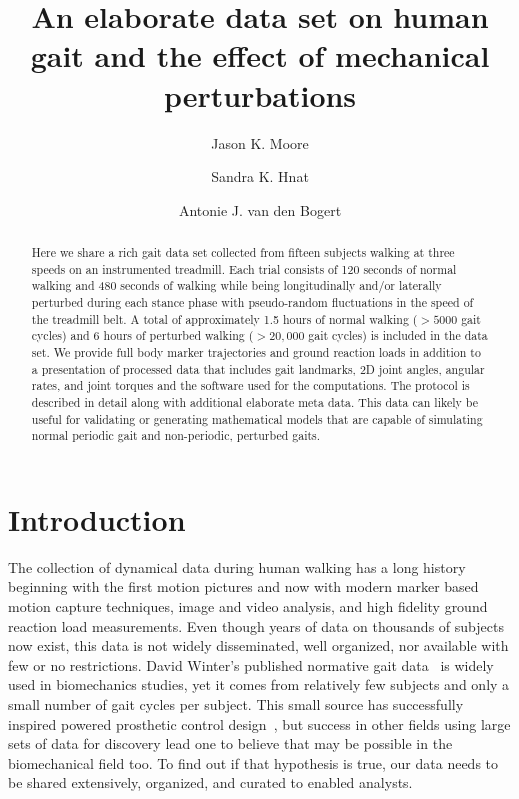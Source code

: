 \documentclass[10pt,a4paper,twocolumn]{article}
\begin{document}
\title{An elaborate data set on human gait and the effect of mechanical
  perturbations}

\author[1]{Jason K. Moore}
\author[1]{Sandra K. Hnat}
\author[1]{Antonie J. van den Bogert}


\maketitle
\thispagestyle{fancy}

\begin{abstract}

  Here we share a rich gait data set collected from fifteen subjects walking at
  three speeds on an instrumented treadmill. Each trial consists of 120 seconds
  of normal walking and 480 seconds of walking while being longitudinally
  and/or laterally perturbed during each stance phase with pseudo-random
  fluctuations in the speed of the treadmill belt. A total of approximately 1.5
  hours of normal walking ($>5000$ gait cycles) and 6 hours of perturbed walking
  ($>20,000$ gait cycles) is included in the data set. We provide full body
  marker trajectories and ground reaction loads in addition to a presentation of
  processed data that includes gait landmarks, 2D joint angles, angular rates,
  and joint torques and the software used for the computations. The protocol is
  described in detail along with additional elaborate meta data. This data can
  likely be useful for validating or generating mathematical models that are
  capable of simulating normal periodic gait and non-periodic, perturbed gaits.

\end{abstract}
\clearpage

\section*{Introduction}
%
The collection of dynamical data during human walking has a long history
beginning with the first motion pictures and now with modern marker based
motion capture techniques, image and video analysis, and high fidelity ground
reaction load measurements. Even though years of data on thousands of subjects
now exist, this data is not widely disseminated, well organized, nor available
with few or no restrictions. David Winter's published normative gait
data~\cite{Winter1990} is widely used in biomechanics studies, yet it comes
from relatively few subjects and only a small number of gait cycles per
subject. This small source has successfully inspired powered prosthetic control
design~\cite{Sup2008}, but success in other fields using large sets of
data for discovery lead one to believe that may be possible in the
biomechanical field too. To find out if that hypothesis is true, our data needs
to be shared extensively, organized, and curated to enabled analysts.
\end{document}
